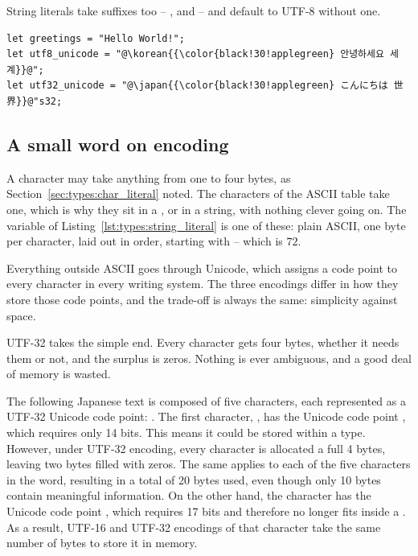 String literals take suffixes too -- ,  and  --
and default to UTF-8 without one.

\begin{lstlisting}[style=coloredverbatim, label=lst:types:string_literal, caption=Example of string literals, escapechar=@]
let greetings = "Hello World!";
let utf8_unicode = "@\korean{{\color{black!30!applegreen} 안녕하세요 세계}}@";
let utf32_unicode = "@\japan{{\color{black!30!applegreen} こんにちは 世界}}@"s32;
\end{lstlisting}

\subsection{A small word on encoding}
\label{sec:types:encoding}

A character may take anything from one to four bytes, as
Section~\ref{sec:types:char_literal} noted. The characters of the ASCII table
take one, which is why they sit in a , or in a \token{[c8]} string,
with nothing clever going on. The  variable of
Listing~\ref{lst:types:string_literal} is one of these: plain ASCII, one byte per
character, laid out in order, starting with  -- which is $72$.




Everything outside ASCII goes through Unicode, which assigns a code point to
every character in every writing system. The three encodings differ in how they
store those code points, and the trade-off is always the same: simplicity against
space.

UTF-32 takes the simple end. Every character gets four bytes, whether it needs
them or not, and the surplus is zeros. Nothing is ever ambiguous, and a good deal
of memory is wasted.



The following Japanese text \colorbox{background!90!gray!60}{}
is composed of five characters, each represented as a UTF‑32
Unicode code point: . The first
character, \colorbox{background!90!gray!60}{}, has the Unicode code point
, which requires only 14 bits. This means it could be stored
within a  type. However, under UTF‑32 encoding, every character is
allocated a full 4 bytes, leaving two bytes filled with zeros. The same
applies to each of the five characters in the word, resulting in a total of 20
bytes used, even though only 10 bytes contain meaningful information. On the
other hand, the character  has the Unicode code point
, which requires 17 bits and therefore no longer fits inside a
. As a result, UTF‑16 and UTF‑32 encodings of that character take
the same number of bytes to store it in memory.



